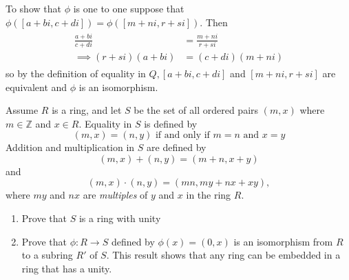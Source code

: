 \documentclass[paper=a4, fontsize=11pt]{jhwhw} %
\begin{document}
To show that $\phi$ is one to one suppose that $\phi([a + bi, c + di]) = \phi([m + ni, r + si])$. Then 
\begin{align}
    \begin{split}
        \frac{a + bi}{c + di} &= \frac{m + ni}{r + si}\\
        \implies (r + si)(a + bi) &= (c + di)(m + ni)
    \end{split}
\end{align}
so by the definition of equality in $Q, [a+bi, c + di]$ and $[m + ni, r + si]$ are equivalent and $\phi$ is an isomorphism. 


Assume $R$ is a ring, and let $S$ be the set of all ordered pairs $(m, x)$ where $m\in \mathbb Z$ and $x\in R$. Equality in $S$ is defined by
$$(m, x) = (n, y)\text{ if and only if } m = n \text{ and } x=y$$
Addition and multiplication in $S$ are defined by
$$(m, x) + (n, y) = (m+n, x+y)$$
and
$$(m, x)\cdot (n, y) = (mn, my + nx + xy),$$
where $my$ and $nx$ are \textit{multiples} of $y$ and $x$ in the ring $R$.
\begin{enumerate}
    \item Prove that $S$ is a ring with unity
    \item Prove that $\phi: R\to S$ defined by $\phi(x) = (0, x)$ is an isomorphism from $R$ to a subring $R'$ of $S$. This result shows that any ring can be embedded in a ring that has a unity.
\end{enumerate}
\solution
\end{document}

